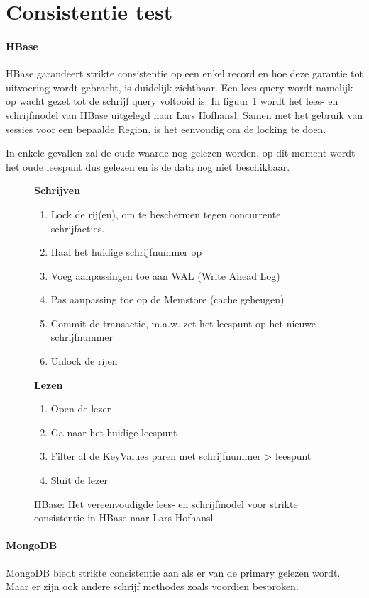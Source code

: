 \section{Consistentie test}
\paragraph{HBase} HBase garandeert strikte consistentie op een enkel record en hoe deze garantie tot uitvoering wordt gebracht, is duidelijk zichtbaar. Een lees query wordt namelijk op wacht gezet tot de schrijf query voltooid is. In figuur \ref{fig:consistency-hbase-uitleg} wordt het lees- en schrijfmodel van HBase uitgelegd naar Lars Hofhansl\cite{hbase-acid}. Samen met het gebruik van sessies voor een bepaalde Region, is het eenvoudig om de locking te doen. 

In enkele gevallen zal de oude waarde nog gelezen worden, op dit moment wordt het oude leespunt dus gelezen en is de data nog niet beschikbaar. 

\begin{figure}[h!]
	\begin{minipage}{0.5\textwidth} 
	\textbf{Schrijven}
	\begin{enumerate}
	\item Lock de rij(en), om te beschermen tegen concurrente schrijfacties. 
	\item Haal het huidige schrijfnummer op
	\item Voeg aanpassingen toe aan WAL (Write Ahead Log)
	\item Pas aanpassing toe op de Memstore (cache geheugen)
	\item Commit de transactie, m.a.w. zet het leespunt op het nieuwe schrijfnummer
	\item Unlock de rijen
	\end{enumerate}
	\end{minipage} \hfill
	\begin{minipage}{0.3\textwidth} 
	\textbf{Lezen}
	\begin{enumerate}
	\item Open de lezer
	\item Ga naar het huidige leespunt
	\item Filter al de KeyValues paren met schrijfnummer > leespunt
	\item Sluit de lezer
	\end{enumerate}
	\end{minipage}
	\caption{HBase: Het vereenvoudigde lees- en schrijfmodel voor strikte consistentie in HBase naar Lars Hofhansl\cite{hbase-acid}}\label{fig:consistency-hbase-uitleg}
\end{figure}

\paragraph{MongoDB} MongoDB biedt strikte consistentie aan als er van de primary gelezen wordt. Maar er zijn ook andere schrijf methodes zoals voordien besproken. 
